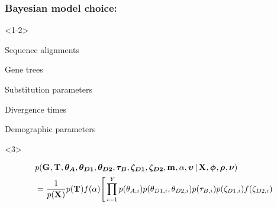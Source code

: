 \begin{frame}[t]
    \frametitle{Bayesian model choice: \msb}
        \begin{onlyenv}<1-2>
        \smallskip
        \begin{mydescription}
            \item[\alignmentVector] Sequence alignments
            \item[\geneTreeVector] Gene trees
            \item[\hkyModelVector] Substitution parameters
            \item[\divTimeMapVector] Divergence times
            \item[\demographicParamVector] Demographic parameters
        \end{mydescription}
        \end{onlyenv}
    \begin{onlyenv}<3>
    \bigskip
    \begin{displaybox}
    {\tiny
    \begin{equation*}
        \begin{split}
        & p(\geneTreeVector,
        \divTimeMapVector,
        \ancestralThetaVector,
        \descendantThetaVector{1}, \descendantThetaVector{2},
        \bottleTimeVector, \bottleScalarVector{1},
        \bottleScalarVector{2},
        \migrationRateVector,
        \locusRateHetShapeParameter,
        \locusMutationRateScalarVector \given
        \alignmentVector, \hkyModelVector, \ploidyScalarVector,
        \mutationRateScalarConstantVector) \\
        & = \frac{1}{p(\alignmentVector)}
        p(\divTimeMapVector)
        f(\locusRateHetShapeParameter)
        \Bigg[
        \prod_{i=1}^{\npairs{}}
        p(\ancestralTheta{i})
        p(\descendantTheta{1}{i}, \descendantTheta{2}{i})
        p(\bottleTime{i})
        p(\bottleScalar{1}{i}) f(\bottleScalar{2}{i})

\end{split}
\end{equation*}}
\end{displaybox}
\end{onlyenv}
\end{frame}
